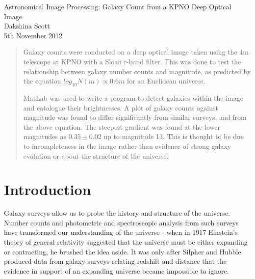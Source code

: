 \documentclass[a4paper,11pt,twoside]{article}
\begin{document}
\begin{titlepage}
\begin{center}

Astronomical Image Processing: Galaxy Count from a KPNO Deep Optical 
Image \\[8cm]
Dakshina Scott \\[4cm]
5th November 2012 \\

\end{center}
\end{titlepage}



\begin{abstract}

Galaxy counts were conducted on a deep optical image taken using the 
4m telescope at KPNO with a Sloan r-band filter. This was done to 
test the relationship between galaxy number counts and magnitude, 
as predicted by the equation \(log_{10} N(m) \propto 0.6m\) for an
Euclidean universe.

MatLab was used to write a program to detect galaxies within the 
image and catalogue their brightnesses. A plot of galaxy counts 
against magnitude was found to differ significantly from similar 
surveys, and from the above equation. The steepest gradient was 
found at the lower magnitudes as \(0.35 \pm 0.02\) up to magnitude 
13. This is thought to be due to incompleteness in the image rather 
than evidence of strong galaxy evolution or about the structure of 
the universe.

\end{abstract}


\tableofcontents


\section{Introduction}

Galaxy surveys allow us to probe the history and structure of the 
universe. Number counts and photometric and spectroscopic analysis 
from such surveys have transformed our understanding of the universe - 
when in 1917 Einstein's theory of general relativity suggested that 
the universe must be either expanding or contracting, he brushed the 
idea aside. It was only after Silpher and Hubble produced data from 
galaxy surveys relating redshift and distance that the evidence in 
support of an expanding universe became impossible to ignore\cite{raine}.
\end{document}

